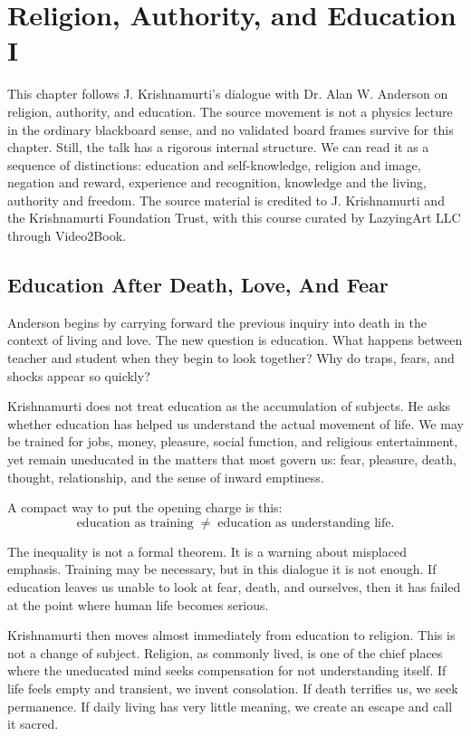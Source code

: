 \chapter{Religion, Authority, and Education I}

This chapter follows J. Krishnamurti's dialogue with Dr. Alan W. Anderson on religion, authority, and education. The source movement is not a physics lecture in the ordinary blackboard sense, and no validated board frames survive for this chapter. Still, the talk has a rigorous internal structure. We can read it as a sequence of distinctions: education and self-knowledge, religion and image, negation and reward, experience and recognition, knowledge and the living, authority and freedom. The source material is credited to J. Krishnamurti and the Krishnamurti Foundation Trust, with this course curated by LazyingArt LLC through Video2Book.

\section{Education After Death, Love, And Fear}

Anderson begins by carrying forward the previous inquiry into death in the context of living and love. The new question is education. What happens between teacher and student when they begin to look together? Why do traps, fears, and shocks appear so quickly?

Krishnamurti does not treat education as the accumulation of subjects. He asks whether education has helped us understand the actual movement of life. We may be trained for jobs, money, pleasure, social function, and religious entertainment, yet remain uneducated in the matters that most govern us: fear, pleasure, death, thought, relationship, and the sense of inward emptiness.

A compact way to put the opening charge is this:
\begin{equation}
\text{education as training}
\;\not=\;
\text{education as understanding life}.
\end{equation}

The inequality is not a formal theorem. It is a warning about misplaced emphasis. Training may be necessary, but in this dialogue it is not enough. If education leaves us unable to look at fear, death, and ourselves, then it has failed at the point where human life becomes serious.

Krishnamurti then moves almost immediately from education to religion. This is not a change of subject. Religion, as commonly lived, is one of the chief places where the uneducated mind seeks compensation for not understanding itself. If life feels empty and transient, we invent consolation. If death terrifies us, we seek permanence. If daily living has very little meaning, we create an escape and call it sacred.


